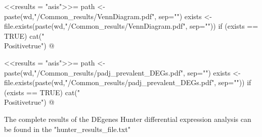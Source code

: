 \documentclass{article}
\begin{document}
\newif\ifPositive

<<results = "asis">>=
path <- paste(wd,"/Common_results/VennDiagram.pdf", sep="")
exists <- file.exists(paste(wd,"/Common_results/VennDiagram.pdf", sep=""))
if (exists == TRUE) {
  cat("\\Positivetrue")
}
@

\ifPositive
  \section{Graph concerning common results}
  \subsection{Venn Diagram}

    This is the Venn Diagram of the all possible DEGs encountered in the experiment (Image extracted from {\bf"VennDiagram.pdf"} file):
    \begin{center}
      \texttt{[image: \\Sexpr\{path]}}
    \end{center}
\fi



\newif\ifPositive

<<results = "asis">>=
path <- paste(wd,"/Common_results/padj_prevalent_DEGs.pdf", sep="")
exists <- file.exists(paste(wd,"/Common_results/padj_prevalent_DEGs.pdf", sep=""))
if (exists == TRUE) {
  cat("\\Positivetrue")
}
@

\ifPositive
  \subsection{FDR gene-wise benchmarking}

  Benchmark of false positive calling (Image extracted from {\bf"padj\_prevalent\_DEGs.pdf"} file):
  \begin{center}
    \texttt{[image: \\Sexpr\{path]}}
  \end{center}
  Estimates of P(p-value $<$ 0.05) under the null hypothesis among prevalent DEGs are shown.  
\fi


The complete results of the DEgenes Hunter differential expression analysis can be found in the "hunter\_results\_file.txt"
\end{document}
